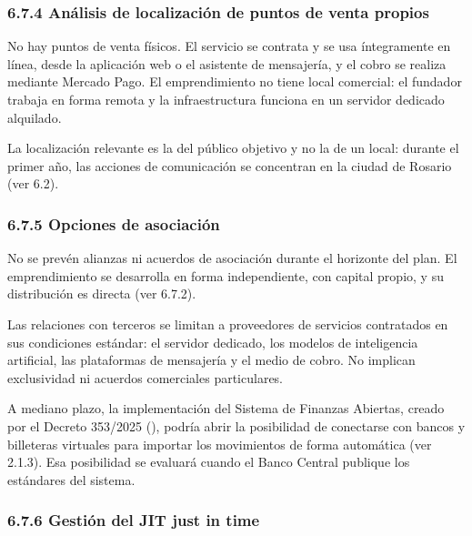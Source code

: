 \subsubsection*{6.7.4 Análisis de localización de puntos de venta
propios}\label{anuxe1lisis-de-localizaciuxf3n-de-puntos-de-venta-propios}

No hay puntos de venta físicos. El servicio se contrata y se usa
íntegramente en línea, desde la aplicación web o el asistente de
mensajería, y el cobro se realiza mediante Mercado Pago. El
emprendimiento no tiene local comercial: el fundador trabaja en forma
remota y la infraestructura funciona en un servidor dedicado alquilado.

La localización relevante es la del público objetivo y no la de un
local: durante el primer año, las acciones de comunicación se concentran
en la ciudad de Rosario (ver 6.2).

\subsubsection*{6.7.5 Opciones de
asociación}\label{opciones-de-asociaciuxf3n}

No se prevén alianzas ni acuerdos de asociación durante el horizonte del
plan. El emprendimiento se desarrolla en forma independiente, con
capital propio, y su distribución es directa (ver 6.7.2).

Las relaciones con terceros se limitan a proveedores de servicios
contratados en sus condiciones estándar: el servidor dedicado, los
modelos de inteligencia artificial, las plataformas de mensajería y el
medio de cobro. No implican exclusividad ni acuerdos comerciales
particulares.

A mediano plazo, la implementación del Sistema de Finanzas Abiertas,
creado por el Decreto 353/2025 (), podría abrir la posibilidad de conectarse con bancos y
billeteras virtuales para importar los movimientos de forma automática
(ver 2.1.3). Esa posibilidad se evaluará cuando el Banco Central
publique los estándares del sistema.

\subsubsection*{6.7.6 Gestión del JIT just in
time}\label{gestiuxf3n-del-jit-just-in-time}

